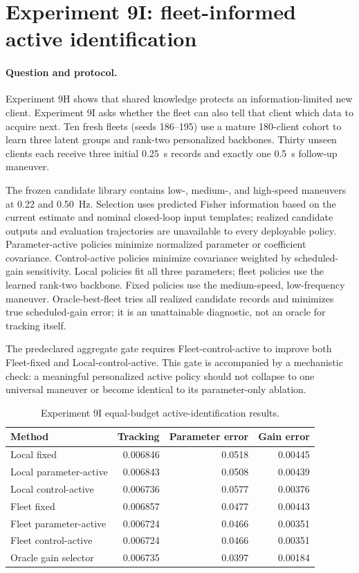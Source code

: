 \section{Experiment 9I: fleet-informed active identification}
\label{sec:experiment9i}

\paragraph{Question and protocol.}
Experiment 9H shows that shared knowledge protects an information-limited new
client. Experiment 9I asks whether the fleet can also tell that client which
data to acquire next. Ten fresh fleets (seeds 186--195) use a mature 180-client
cohort to learn three latent groups and rank-two personalized backbones. Thirty
unseen clients each receive three initial 0.25~s records and exactly one 0.5~s
follow-up maneuver.

The frozen candidate library contains low-, medium-, and high-speed maneuvers at
0.22 and 0.50~Hz. Selection uses predicted Fisher information based on the
current estimate and nominal closed-loop input templates; realized candidate
outputs and evaluation trajectories are unavailable to every deployable policy.
Parameter-active policies minimize normalized parameter or coefficient
covariance. Control-active policies minimize covariance weighted by scheduled-
gain sensitivity. Local policies fit all three parameters; fleet policies use
the learned rank-two backbone. Fixed policies use the medium-speed, low-frequency
maneuver. Oracle-best-fleet tries all realized candidate records and minimizes
true scheduled-gain error; it is an unattainable diagnostic, not an oracle for
tracking itself.

The predeclared aggregate gate requires Fleet-control-active to improve both
Fleet-fixed and Local-control-active. This gate is accompanied by a mechanistic
check: a meaningful personalized active policy should not collapse to one
universal maneuver or become identical to its parameter-only ablation.

\begin{table}[htbp]
\centering
\caption{Experiment 9I equal-budget active-identification results.}
\label{tab:experiment9i-results}
\begin{tabular}{lrrr}
\toprule
Method & Tracking & Parameter error & Gain error\\
\midrule
Local fixed & 0.006846 & 0.0518 & 0.00445\\
Local parameter-active & 0.006843 & 0.0508 & 0.00439\\
Local control-active & 0.006736 & 0.0577 & 0.00376\\
Fleet fixed & 0.006857 & 0.0477 & 0.00443\\
Fleet parameter-active & 0.006724 & 0.0466 & 0.00351\\
Fleet control-active & 0.006724 & 0.0466 & 0.00351\\
Oracle gain selector & 0.006735 & 0.0397 & 0.00184\\
\bottomrule
\end{tabular}
\end{table}

